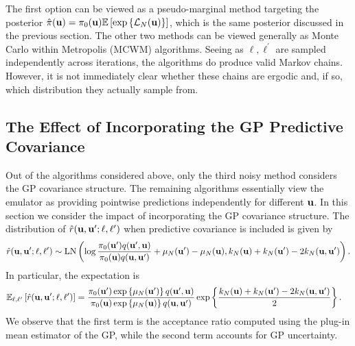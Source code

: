 \documentclass[12pt]{article}
\begin{document}
The first option can be viewed as a pseudo-marginal method targeting the posterior $\hat{\postDens}(\bpar) = \priorDens(\bpar) \E\left[\exp\left\{\llik_{\Ndesign}(\bpar)\right\}\right]$, which is the same 
posterior discussed in the previous section. The other two methods can be viewed generally as Monte Carlo within Metropolis (MCWM) algorithms. Seeing as $\ell, \ell^\prime$ 
are sampled independently across iterations, the algorithms do produce valid Markov chains. However, it is not immediately clear whether these chains are ergodic and, if so, which 
distribution they actually sample from. 

\subsection{The Effect of Incorporating the GP Predictive Covariance}
Out of the algorithms considered above, only the third noisy method considers the GP covariance structure. The remaining algorithms essentially view the emulator as providing 
pointwise predictions independently for different $\bpar$. In this section we consider the impact of incorporating the GP covariance structure. The distribution of 
$\hat{r}(\bpar, \bpar^\prime; \ell, \ell^\prime)$ when predictive covariance is included is given by 
\begin{align*}
\hat{r}(\bpar, \bpar^\prime; \ell, \ell^\prime) \sim \text{LN}\left(\log \frac{\priorDens(\bpar^\prime)\propDens(\bpar^\prime, \bpar)}{\priorDens(\bpar)\propDens(\bpar, \bpar^\prime)} 
+ \GPMeanPred[\Ndesign](\bpar^\prime) - \GPMeanPred[\Ndesign](\bpar), \GPKerPred[\Ndesign](\bpar) + \GPKerPred[\Ndesign](\bpar^\prime) - 2\GPKerPred[\Ndesign](\bpar, \bpar^\prime) \right).
\end{align*}
In particular, the expectation is 
\begin{align*}
\E_{\ell, \ell^\prime}\left[\hat{r}(\bpar, \bpar^\prime; \ell, \ell^\prime)\right]
&= \frac{\priorDens(\bpar^\prime)\exp\left\{\GPMeanPred[\Ndesign](\bpar^\prime)\right\} \propDens(\bpar^\prime, \bpar)}{\priorDens(\bpar) \exp\left\{\GPMeanPred[\Ndesign](\bpar)\right\} \propDens(\bpar, \bpar^\prime)}
\exp\left\{\frac{\GPKerPred[\Ndesign](\bpar) + \GPKerPred[\Ndesign](\bpar^\prime) - 2\GPKerPred[\Ndesign](\bpar, \bpar^\prime) }{2} \right\}.
\end{align*}
We observe that the first term is the acceptance ratio computed using the plug-in mean estimator of the GP, while the second term accounts for GP uncertainty. 
\end{document}
